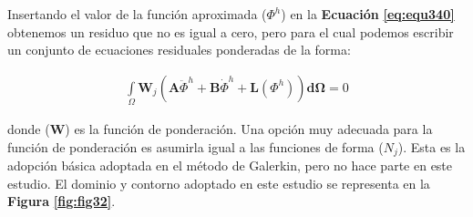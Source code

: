 Insertando el valor de la función aproximada ($\Phi^h$) en la \textbf{Ecuación} \textbf{\ref{eq:equ340}} obtenemos un residuo que no es igual a cero, pero para el cual
podemos escribir un conjunto de ecuaciones residuales ponderadas de la forma:

\begin{ceqn} %
\begin{gather}\label{eq:equ350}
\int\limits_\Omega \mathbf{W}_j\left(\mathbf{A}\ddot{\Phi}^h + \mathbf{B}\dot{\Phi}^h + \mathbf{L}(\Phi^h)\right)\mathbf{d\Omega} = 0
\end{gather}   
\end{ceqn}

donde ($\mathbf{W}$) es la función de ponderación. Una opción muy adecuada para la función de ponderación es asumirla igual a las funciones de forma ($N_j$). Esta es la adopción básica adoptada en el método de Galerkin, pero no hace parte en este estudio. El dominio y contorno adoptado en este estudio se representa en la \textbf{Figura} \textbf{\ref{fig:fig32}}.\bigskip


